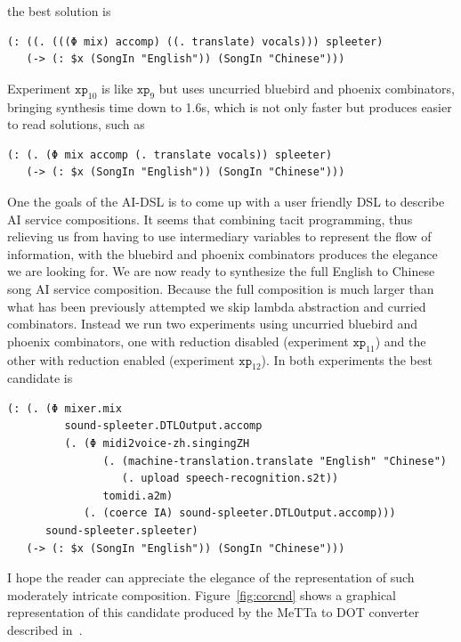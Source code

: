 \documentclass[]{report}
\begin{document}
the best solution is
\begin{verbatim}
(: ((. (((Φ mix) accomp) ((. translate) vocals))) spleeter)
   (-> (: $x (SongIn "English")) (SongIn "Chinese")))
\end{verbatim}
Experiment $\texttt{xp}_{10}$ is like $\texttt{xp}_9$ but uses
uncurried bluebird and phoenix combinators, bringing synthesis time
down to 1.6s, which is not only faster but produces easier to read
solutions, such as
\begin{verbatim}
(: (. (Φ mix accomp (. translate vocals)) spleeter)
   (-> (: $x (SongIn "English")) (SongIn "Chinese")))
\end{verbatim}
One the goals of the AI-DSL is to come up with a user friendly DSL to
describe AI service compositions.  It seems that combining tacit
programming, thus relieving us from having to use intermediary
variables to represent the flow of information, with the bluebird and
phoenix combinators produces the elegance we are looking for.  We are
now ready to synthesize the full English to Chinese song AI service
composition.  Because the full composition is much larger than what
has been previously attempted we skip lambda abstraction and curried
combinators.  Instead we run two experiments using uncurried bluebird
and phoenix combinators, one with reduction disabled (experiment
$\texttt{xp}_{11}$) and the other with reduction enabled (experiment
$\texttt{xp}_{12}$).  In both experiments the best candidate is
\begin{small}
\begin{verbatim}
(: (. (Φ mixer.mix
         sound-spleeter.DTLOutput.accomp
         (. (Φ midi2voice-zh.singingZH
               (. (machine-translation.translate "English" "Chinese")
                  (. upload speech-recognition.s2t))
               tomidi.a2m)
            (. (coerce IA) sound-spleeter.DTLOutput.accomp)))
      sound-spleeter.spleeter)
   (-> (: $x (SongIn "English")) (SongIn "Chinese")))
\end{verbatim}
\end{small}
I hope the reader can appreciate the elegance of the representation of
such moderately intricate composition.  Figure~\ref{fig:corcnd} shows
a graphical representation of this candidate produced by the MeTTa to
DOT converter described in~\cite{MeTTaToDOT}.
\end{document}
